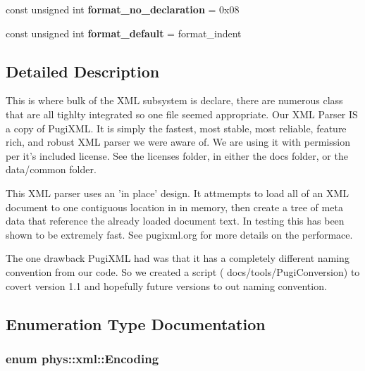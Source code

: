 \begin{DoxyCompactItemize}
\item 
\hypertarget{namespacephys_1_1xml_a6293fa2924378187e6f8e2d5d48a1079}{
const unsigned int {\bfseries format\_\-no\_\-declaration} = 0x08}
\label{d9/d27/namespacephys_1_1xml_a6293fa2924378187e6f8e2d5d48a1079}

\item 
\hypertarget{namespacephys_1_1xml_a0bad653e27a327962dc6df17757aeb1f}{
const unsigned int {\bfseries format\_\-default} = format\_\-indent}
\label{d9/d27/namespacephys_1_1xml_a0bad653e27a327962dc6df17757aeb1f}

\end{DoxyCompactItemize}


\subsection{Detailed Description}
This is where bulk of the XML subsystem is declare, there are numerous class that are all tighlty integrated so one file seemed appropriate. Our XML Parser IS a copy of PugiXML. It is simply the fastest, most stable, most reliable, feature rich, and robust XML parser we were aware of. We are using it with permission per it's included license. See the licenses folder, in either the docs folder, or the data/common folder. \par
 \par
 This XML parser uses an 'in place' design. It attmempts to load all of an XML document to one contiguous location in in memory, then create a tree of meta data that reference the already loaded document text. In testing this has been shown to be extremely fast. See pugixml.org for more details on the performace. \par
 \par
 The one drawback PugiXML had was that it has a completely different naming convention from our code. So we created a script ( docs/tools/PugiConversion) to covert version 1.1 and hopefully future versions to out naming convention. 

\subsection{Enumeration Type Documentation}
\hypertarget{namespacephys_1_1xml_a420f5de782438f88160321385bea2015}{
\subsubsection[{Encoding}]{\setlength{\rightskip}{0pt plus 5cm}enum {\bf phys::xml::Encoding}}}
\label{d9/d27/namespacephys_1_1xml_a420f5de782438f88160321385bea2015}


